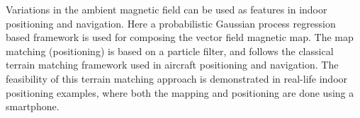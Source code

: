 Variations in the ambient magnetic field can be used as features in
indoor positioning and navigation. Here a probabilistic Gaussian
process regression based framework is used for composing the
vector field magnetic map. The map matching (positioning) is based
on a particle filter, and follows the classical terrain matching
framework used in aircraft positioning and navigation. The feasibility
of this terrain matching approach is demonstrated in real-life indoor
positioning examples, where both the mapping and positioning are
done using a smartphone.
